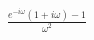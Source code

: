 \documentclass[preview]{standalone}
\begin{document}
\begin{align*}
\frac{e^{-i\omega}(1+i\omega)-1}{\omega^{2}}
\end{align*}
\end{document}
